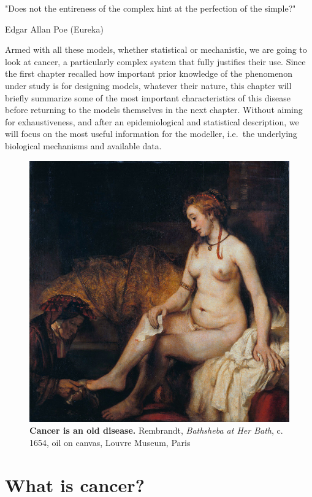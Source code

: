 \documentclass[a4paper,12pt,twoside,onecolumn,openright,final,oldfontcommands]{memoir}
\newcommand{\initial}[1]{
	\lettrine[lines=3,lhang=0.33,nindent=0em]{
		\color{gray}
     		{\textsc{#1}}}{}}
\begin{document}
\epigraph{"Does not the entireness of the complex hint at the perfection of the simple?"}{Edgar Allan Poe (Eureka)}

\initial{A}rmed with all these models, whether statistical or
mechanistic, we are going to look at cancer, a particularly complex
system that fully justifies their use. Since the first chapter recalled
how important prior knowledge of the phenomenon under study is for
designing models, whatever their nature, this chapter will briefly
summarize some of the most important characteristics of this disease
before returning to the models themselves in the next chapter. Without
aiming for exhaustiveness, and after an epidemiological and statistical
description, we will focus on the most useful information for the
modeller, i.e.~the underlying biological mechanisms and available data.

\begin{figure}

{\centering \includegraphics[width=0.9\linewidth]{fig/bath} 

}

\caption[Cancer is an old disease]{\textbf{Cancer is an old disease.} Rembrandt,
\emph{Bathsheba at Her Bath}, c. 1654, oil on canvas, Louvre Museum,
Paris}\label{fig:bath}
\end{figure}





\section{What is cancer?}\label{what-is-cancer}
\end{document}
